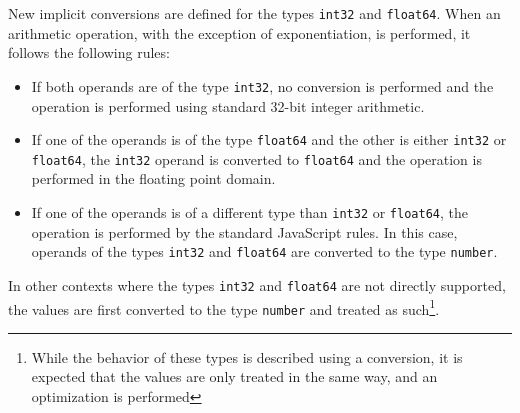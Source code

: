 New implicit conversions are defined for the types \texttt{int32} and \texttt{float64}. When an arithmetic operation, with the exception of exponentiation, is performed, it follows the following rules:

\begin{itemize}
    \item If both operands are of the type \texttt{int32}, no conversion is performed and the operation is performed using standard 32-bit integer arithmetic.
    \item If one of the operands is of the type \texttt{float64} and the other is either \texttt{int32} or \texttt{float64}, the \texttt{int32} operand is converted to \texttt{float64} and the operation is performed in the floating point domain.
    \item If one of the operands is of a different type than \texttt{int32} or \texttt{float64}, the operation is performed by the standard JavaScript rules. In this case, operands of the types \texttt{int32} and \texttt{float64} are converted to the type \texttt{number}.
\end{itemize}

In other contexts where the types \texttt{int32} and \texttt{float64} are not directly supported, the values are first converted to the type \texttt{number} and treated as such\footnote{While the behavior of these types is described using a conversion, it is expected that the values are only treated in the same way, and an optimization is performed}.




